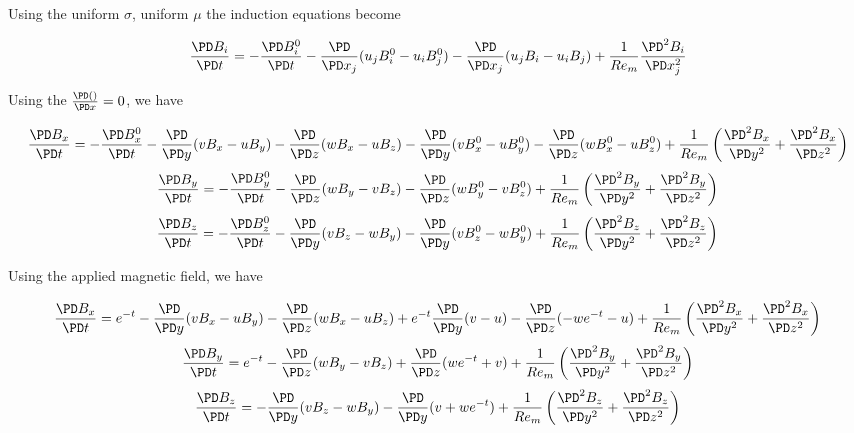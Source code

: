 \documentclass[11pt]{article}
\begin{document}
Using the uniform $\sigma$, uniform $\mu$ the induction equations become

\begin{equation}
	\frac{\PD B_i}{\PD t}
	=
	- \frac{\PD B_i^0}{\PD t}
	- \frac{\PD}{\PD x_j} (u_j B_i^0 - u_i B_j^0)
	- \frac{\PD}{\PD x_j} (u_j B_i - u_i B_j)
	+
	\frac{1}{Re_m}
	\frac{\PD^2 B_i}{\PD x_j^2}
\end{equation}

Using the $\frac{\PD ()}{\PD x} = 0$, we have

\begin{equation}
	\frac{\PD B_x}{\PD t}
	=
	- \frac{\PD B_x^0}{\PD t}
	- \frac{\PD}{\PD y} (v B_x - u B_y)
	- \frac{\PD}{\PD z} (w B_x - u B_z)
	- \frac{\PD}{\PD y} (v B_x^0 - u B_y^0)
	- \frac{\PD}{\PD z} (w B_x^0 - u B_z^0)
	+
	\frac{1}{Re_m}
	\left(
	\frac{\PD^2 B_x}{\PD y^2}
	+ \frac{\PD^2 B_x}{\PD z^2}
	\right)
\end{equation}
\begin{equation}
	\frac{\PD B_y}{\PD t}
	=
	- \frac{\PD B_y^0}{\PD t}
	- \frac{\PD}{\PD z} (w B_y - v B_z)
	- \frac{\PD}{\PD z} (w B_y^0 - v B_z^0)
	+
	\frac{1}{Re_m}
	\left(
	\frac{\PD^2 B_y}{\PD y^2}
	+ \frac{\PD^2 B_y}{\PD z^2}
	\right)
\end{equation}
\begin{equation}
	\frac{\PD B_z}{\PD t}
	=
	- \frac{\PD B_z^0}{\PD t}
	- \frac{\PD}{\PD y} (v B_z - w B_y)
	- \frac{\PD}{\PD y} (v B_z^0 - w B_y^0)
	+
	\frac{1}{Re_m}
	\left(
	\frac{\PD^2 B_z}{\PD y^2}
	+ \frac{\PD^2 B_z}{\PD z^2}
	\right)
\end{equation}

Using the applied magnetic field, we have

\begin{equation}
	\frac{\PD B_x}{\PD t}
	=
	e^{-t}
	- \frac{\PD}{\PD y} (v B_x - u B_y)
	- \frac{\PD}{\PD z} (w B_x - u B_z)
	+ e^{-t} \frac{\PD}{\PD y} (v - u)
	- \frac{\PD}{\PD z} (-w e^{-t} - u)
	+
	\frac{1}{Re_m}
	\left(
	\frac{\PD^2 B_x}{\PD y^2}
	+ \frac{\PD^2 B_x}{\PD z^2}
	\right)
\end{equation}
\begin{equation}
	\frac{\PD B_y}{\PD t}
	=
	e^{-t}
	- \frac{\PD}{\PD z} (w B_y - v B_z)
	+ \frac{\PD}{\PD z} (w e^{-t} + v)
	+
	\frac{1}{Re_m}
	\left(
	\frac{\PD^2 B_y}{\PD y^2}
	+ \frac{\PD^2 B_y}{\PD z^2}
	\right)
\end{equation}
\begin{equation}
	\frac{\PD B_z}{\PD t}
	=
	- \frac{\PD}{\PD y} (v B_z - w B_y)
	- \frac{\PD}{\PD y} (v + w e^{-t})
	+
	\frac{1}{Re_m}
	\left(
	\frac{\PD^2 B_z}{\PD y^2}
	+ \frac{\PD^2 B_z}{\PD z^2}
	\right)
\end{equation}
\end{document}
